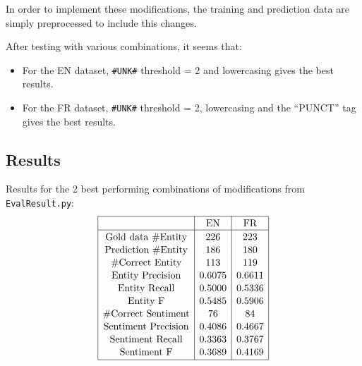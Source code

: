 \documentclass[12pt]{article}
\begin{document}
In order to implement these modifications, the training and prediction data are simply preprocessed to include this changes.

After testing with various combinations, it seems that:
\begin{itemize}
\item For the EN dataset, \verb|#UNK#| threshold = 2 and lowercasing gives the best results.
\item For the FR dataset, \verb|#UNK#| threshold = 2, lowercasing and the ``PUNCT'' tag gives the best results.
\end{itemize}

\subsection{Results}
Results for the 2 best performing combinations of modifications from \verb|EvalResult.py|:
\[
\begin{array}{|c|c|c|}
\hline \rule{0pt}{1em}
& \mbox{EN} & \mbox{FR} \\
\hline \rule{0pt}{1em}
\mbox{Gold data \#Entity} & 226    & 223    \\[0.1em]
\mbox{Prediction \#Entity}& 186    & 180    \\[0.1em]
\mbox{\#Correct Entity}   & 113    & 119    \\[0.1em]
\mbox{Entity Precision}   & 0.6075 & 0.6611 \\[0.1em]
\mbox{Entity Recall}      & 0.5000 & 0.5336 \\[0.1em]
\mbox{Entity F}           & 0.5485 & 0.5906 \\[0.1em]
\mbox{\#Correct Sentiment}& 76     & 84     \\[0.1em]
\mbox{Sentiment Precision}& 0.4086 & 0.4667 \\[0.1em]
\mbox{Sentiment Recall}   & 0.3363 & 0.3767 \\[0.1em]
\mbox{Sentiment F}        & 0.3689 & 0.4169 \\[0.1em] 
\hline
\end{array}
\]
\end{document}
